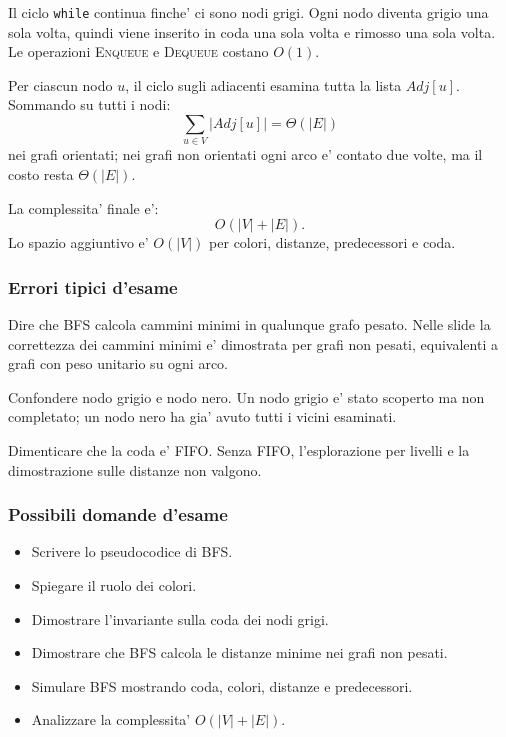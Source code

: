 Il ciclo \texttt{while} continua finche' ci sono nodi grigi. Ogni nodo diventa grigio una sola volta, quindi viene inserito in coda una sola volta e rimosso una sola volta. Le operazioni \textsc{Enqueue} e \textsc{Dequeue} costano $O(1)$.

Per ciascun nodo $u$, il ciclo sugli adiacenti esamina tutta la lista $Adj[u]$. Sommando su tutti i nodi:
\[
\sum_{u\in V}|Adj[u]|=\Theta(|E|)
\]
nei grafi orientati; nei grafi non orientati ogni arco e' contato due volte, ma il costo resta $\Theta(|E|)$.

La complessita' finale e':
\[
O(|V|+|E|).
\]
Lo spazio aggiuntivo e' $O(|V|)$ per colori, distanze, predecessori e coda.

\subsubsection{Errori tipici d'esame}
\begin{hardnote}
Dire che BFS calcola cammini minimi in qualunque grafo pesato. Nelle slide la correttezza dei cammini minimi e' dimostrata per grafi non pesati, equivalenti a grafi con peso unitario su ogni arco.
\end{hardnote}

\begin{hardnote}
Confondere nodo grigio e nodo nero. Un nodo grigio e' stato scoperto ma non completato; un nodo nero ha gia' avuto tutti i vicini esaminati.
\end{hardnote}

\begin{hardnote}
Dimenticare che la coda e' FIFO. Senza FIFO, l'esplorazione per livelli e la dimostrazione sulle distanze non valgono.
\end{hardnote}

\subsubsection{Possibili domande d'esame}
\begin{itemize}
	\item Scrivere lo pseudocodice di BFS.
	\item Spiegare il ruolo dei colori.
	\item Dimostrare l'invariante sulla coda dei nodi grigi.
	\item Dimostrare che BFS calcola le distanze minime nei grafi non pesati.
	\item Simulare BFS mostrando coda, colori, distanze e predecessori.
	\item Analizzare la complessita' $O(|V|+|E|)$.
\end{itemize}


